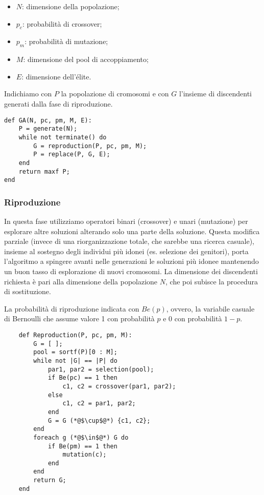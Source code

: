 \begin{itemize}
    \item $N$: dimensione della popolazione;
    \item $p_c$: probabilità di crossover;
    \item $p_m$: probabilità di mutazione;
    \item $M$: dimensione del pool di accoppiamento;
    \item $E$: dimensione dell'élite.
\end{itemize}

Indichiamo con $P$ la popolazione di cromosomi e con $G$ l'insieme di discendenti generati dalla fase di riproduzione.

\begin{lstlisting}
def GA(N, pc, pm, M, E):
    P = generate(N);
    while not terminate() do
        G = reproduction(P, pc, pm, M);
        P = replace(P, G, E);
    end
    return maxf P;
end
\end{lstlisting}

\subsubsection{Riproduzione}
In questa fase utilizziamo operatori binari (crossover) e unari (mutazione) per esplorare altre soluzioni alterando solo una parte della soluzione. Questa modifica parziale (invece di una riorganizzazione totale, che sarebbe una ricerca casuale), insieme al sostegno degli individui più idonei (es. selezione dei genitori), porta l'algoritmo a spingere avanti nelle generazioni le soluzioni più idonee mantenendo un buon tasso di esplorazione di nuovi cromosomi. La dimensione dei discendenti richiesta è pari alla dimensione della popolazione $N$, che poi subisce la procedura di sostituzione.

La probabilità di riproduzione indicata con $Be(p)$, ovvero, la variabile casuale di Bernoulli che assume valore 1 con probabilità $p$ e 0 con probabilità $1-p$.

\begin{lstlisting}
    def Reproduction(P, pc, pm, M):
        G = [ ];
        pool = sortf(P)[0 : M];
        while not |G| == |P| do
            par1, par2 = selection(pool);
            if Be(pc) == 1 then
                c1, c2 = crossover(par1, par2);
            else
                c1, c2 = par1, par2;
            end
            G = G (*@$\cup$@*) {c1, c2};
        end
        foreach g (*@$\in$@*) G do
            if Be(pm) == 1 then
                mutation(c);
            end
        end
        return G;
    end
\end{lstlisting}

